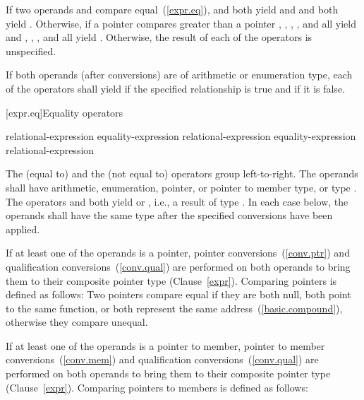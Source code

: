 \pnum
If two operands  and  compare equal~(\ref{expr.eq}),
 and  both yield  and  and
 both yield . Otherwise, if a pointer 
compares greater than a pointer , , ,
, and  all yield  and ,
, , and  all yield .
Otherwise, the result of each of the operators is unspecified.

\pnum
If both operands (after conversions) are of arithmetic or enumeration type, each
of the operators shall yield  if the specified relationship is true
and  if it is false.

[expr.eq]{Equality operators}%
%
%

\begin{bnf}
\br
    relational-expression\br
    equality-expression \terminal{==} relational-expression\br
    equality-expression \terminal{!=} relational-expression
\end{bnf}

\pnum
The \tcode{==} (equal to) and the \tcode{!=} (not equal to) operators
group left-to-right. The operands shall have arithmetic, enumeration, pointer,
or pointer to member type, or type . The operators
\tcode{==} and \tcode{!=} both yield  or , i.e., a
result of type . In each case below, the operands shall have the
same type after the specified conversions have been applied.

%
%
\pnum
If at least one of the operands is a pointer, pointer
conversions~(\ref{conv.ptr}) and qualification conversions~(\ref{conv.qual})
are performed on both operands to bring them to their composite pointer type
(Clause~\ref{expr}). Comparing pointers is defined as follows:
Two pointers compare equal if they are both null, both point to the same
%
function, or both represent the same address~(\ref{basic.compound}), otherwise
they compare unequal.

\pnum
If at least one of the operands is a pointer to member, pointer to member
conversions~(\ref{conv.mem}) and qualification
conversions~(\ref{conv.qual}) are performed on both operands to bring them to
their composite pointer type (Clause~\ref{expr}).
Comparing pointers to members is defined as follows:

